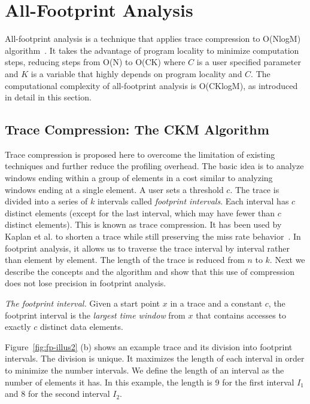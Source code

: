 \section{All-Footprint Analysis}
\label{sec:all-fp}

All-footprint analysis is a technique that applies trace compression
to O(NlogM) algorithm~\cite{DingC:PPOPP08}. It
takes the advantage of program locality to minimize computation steps,
reducing steps from O(N) to O(CK) where $C$ is a user specified
parameter and $K$ is a variable that highly depends on program locality and
$C$. The computational complexity of all-footprint analysis is
O(CKlogM), as introduced in detail in this section.

\subsection{Trace Compression: The CKM Algorithm}

Trace compression is proposed here to overcome the limitation of
existing techniques and further reduce the profiling overhead.
The basic idea is to analyze windows ending within a group of elements
in a cost similar to analyzing windows ending at a single element.
A user sets a threshold $c$.  The trace is divided into a
series of $k$ intervals called \emph{footprint intervals}.  Each
interval has $c$ distinct elements (except for the last interval,
which may have fewer than $c$ distinct elements). This is known as
trace compression.  It has been used by Kaplan et al. to shorten a
trace while still preserving the miss rate behavior~\cite{Kaplan+:TOMACS03}.
In footprint analysis, it allows us to traverse the trace interval by
interval rather than element by element.  The length of the trace is
reduced from $n$ to $k$. Next we describe the concepts and the
algorithm and show that this use of compression does not lose
precision in footprint analysis.

\begin{definition} {\em The footprint interval.}  Given a start point
  $x$ in a trace and a constant $c$, the footprint interval is the
  \emph{largest time window} from $x$ that contains accesses to
  exactly $c$ distinct data elements.
\end{definition}

Figure~\ref{fig:fp-illus2} (b) shows an example trace and its division into
footprint intervals.  The division is unique.  It maximizes the length
of each interval in order to minimize the number intervals.  We define
the length of an interval as the number of elements it has.  In this
example, the length is 9 for the first interval $I_1$ and 8 for the
second interval $I_2$.

